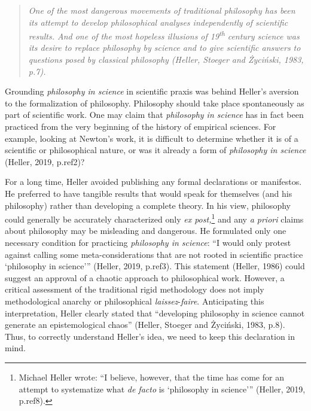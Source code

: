 \documentclass[a4paper]{article}
\newcommand\textstylest[1]{#1}
\begin{document}
\begin{quotation}
\textit{One of the most dangerous movements of traditional philosophy has been its attempt to develop philosophical
analyses independently of scientific results. And one of the most hopeless illusions of
19}\textit{\textsuperscript{th}}\textit{ century science was its desire to replace philosophy by science and to give
scientific answers to questions posed by classical philosophy (Heller, Stoeger and Życiński, 1983, p.7).}

\end{quotation}
Grounding \textit{philosophy in science }in scientific praxis was behind Heller’s aversion to the formalization of
philosophy. Philosophy should take place spontaneously as part of scientific work. One may claim that
\textit{philosophy in science }has in fact been practiced from the very beginning of the history of empirical sciences.
For example, looking at Newton’s work, it is difficult to determine whether it is of a scientific or philosophical
nature, or was it already a form of \textit{philosophy in science }(Heller, 2019, p.ref2)?

For a long time, Heller avoided publishing any formal declarations or manifestos. He preferred to have tangible results
that would speak for themselves (and his philosophy) rather than developing a complete theory. In his view, philosophy
could generally be accurately characterized only \textit{ex post,}\footnote{Michael Heller wrote: “I believe, however,
that the time has come for an attempt to systematize what \textit{de facto} is ‘philosophy in science’” (Heller, 2019,
p.ref8).} and any \textit{a priori }claims about philosophy may be misleading and dangerous. He formulated only one
necessary condition for practicing \textit{philosophy in science}: “I would only protest against calling some
meta-considerations that are not rooted in scientific practice ‘philosophy in science’” (Heller, 2019, p.ref3). This
statement (Heller, 1986) could suggest an approval of a chaotic approach to philosophical work. However, a critical
assessment of the traditional rigid methodology does not imply methodological anarchy or philosophical
\emph{laissez}\textstylest{{}-}\emph{faire}. Anticipating this interpretation, Heller clearly stated that “developing
philosophy in science cannot generate an epistemological chaos” (Heller, Stoeger and Życiński, 1983, p.8). Thus, to
correctly understand Heller’s idea, we need to keep this declaration in mind.
\end{document}
